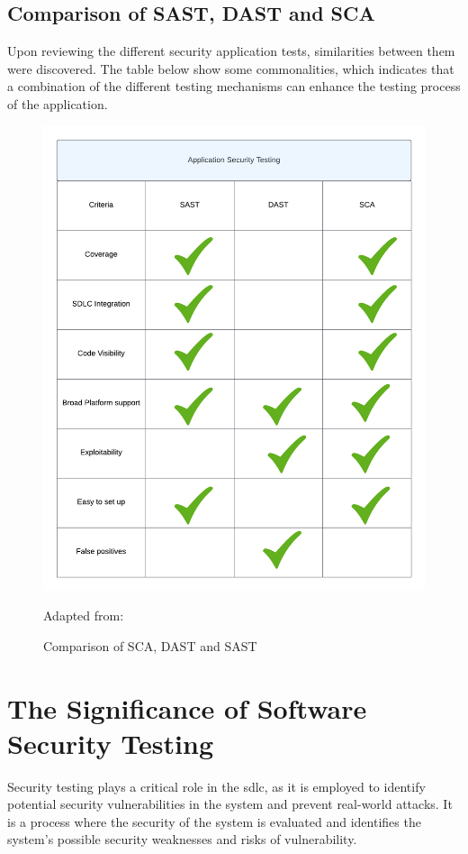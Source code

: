 \subsection{Comparison of SAST, DAST and SCA}
Upon reviewing the different security application tests, similarities between them were discovered. The table below show some commonalities, which indicates that a combination of the different testing mechanisms can enhance the testing process of the application. 
\begin{figure}[H]
    \centering
    \includegraphics[width=0.8\columnwidth]{Images/ApplicationSecurityTesting.png}
    \caption{Comparison of SCA, DAST and SAST}Adapted from: \cite{Comparison}
    \label{fig:Comparison of SCA, DAST and SASt}
\end{figure}

\newpage
\section{The Significance of Software Security Testing}
Security testing plays a critical role in the \acrlong{sdlc}, as it is employed to identify potential security vulnerabilities in the system and prevent real-world attacks. It is a process where the security of the system is evaluated and identifies the system's possible security weaknesses and risks of vulnerability.\cite{whysectest}


